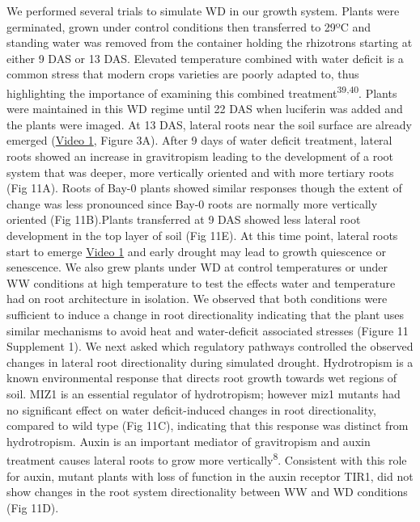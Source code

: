 \documentclass[]{article}
\begin{document}
We performed several trials to simulate WD in our growth system. Plants
were germinated, grown under control conditions then transferred to 29ºC
and standing water was removed from the container holding the rhizotrons
starting at either 9 DAS or 13 DAS. Elevated temperature combined with
water deficit is a common stress that modern crops varieties are poorly
adapted to, thus highlighting the importance of examining this combined
treatment\textsuperscript{39,40}. Plants were maintained in this WD
regime until 22 DAS when luciferin was added and the plants were imaged.
At 13 DAS, lateral roots near the soil surface are already emerged
(\href{https://www.dropbox.com/s/sxjc04o0yj2faif/Video_1.avi?dl=0}{Video
1}, Figure 3A). After 9 days of water deficit treatment, lateral roots
showed an increase in gravitropism leading to the development of a root
system that was deeper, more vertically oriented and with more tertiary
roots (Fig 11A). Roots of Bay-0 plants showed similar responses though
the extent of change was less pronounced since Bay-0 roots are normally
more vertically oriented (Fig 11B).Plants transferred at 9 DAS showed
less lateral root development in the top layer of soil (Fig 11E). At
this time point, lateral roots start to emerge
\href{https://www.dropbox.com/s/sxjc04o0yj2faif/Video_1.avi?dl=0}{Video
1} and early drought may lead to growth quiescence or senescence. We
also grew plants under WD at control temperatures or under WW conditions
at high temperature to test the effects water and temperature had on
root architecture in isolation. We observed that both conditions were
sufficient to induce a change in root directionality indicating that the
plant uses similar mechanisms to avoid heat and water-deficit associated
stresses (Figure 11 Supplement 1). We next asked which regulatory
pathways controlled the observed changes in lateral root directionality
during simulated drought. Hydrotropism is a known environmental response
that directs root growth towards wet regions of soil. MIZ1 is an
essential regulator of hydrotropism; however miz1 mutants had no
significant effect on water deficit-induced changes in root
directionality, compared to wild type (Fig 11C), indicating that this
response was distinct from hydrotropism. Auxin is an important mediator
of gravitropism and auxin treatment causes lateral roots to grow more
vertically\textsuperscript{8}. Consistent with this role for auxin,
mutant plants with loss of function in the auxin receptor TIR1, did not
show changes in the root system directionality between WW and WD
conditions (Fig 11D).
\end{document}

